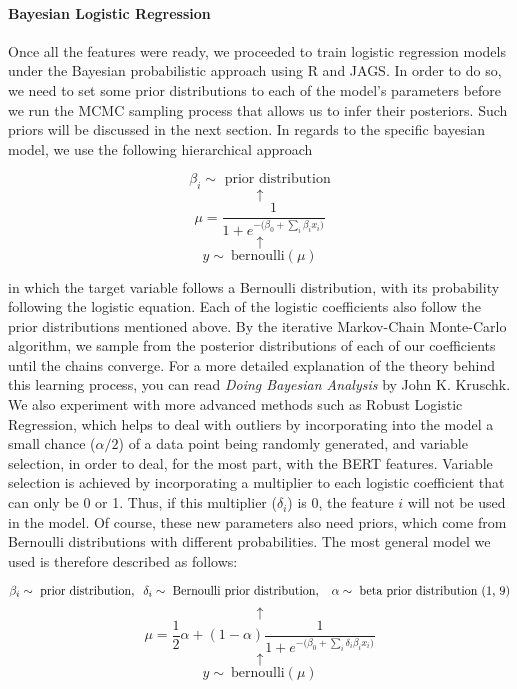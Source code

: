 \documentclass[man, floatsintext, 10pt]{apa6}
\begin{document}
\vspace{2mm}

\paragraph{Bayesian Logistic Regression} Once all the features were ready, we proceeded to train logistic regression models under the Bayesian probabilistic approach using R and JAGS. In order to do so, we need to set some prior distributions to each of the model's parameters before we run the MCMC sampling process that allows us to infer their posteriors. Such priors will be discussed in the next section. In regards to the specific bayesian model, we use the following hierarchical approach 

\[\beta_i \sim \text{ prior distribution} \] \[ \uparrow \] \[ \mu = \frac{1}{1 + e^{-\big(\beta_0 + \sum_i \beta_i x_i \big)}} \] \vspace{0.01mm}  \[ \uparrow \] \[ y \sim\ \text{bernoulli} (\mu) \]

in which the target variable follows a Bernoulli distribution, with its probability following the logistic equation. Each of the logistic coefficients also follow the prior distributions mentioned above. By the iterative Markov-Chain Monte-Carlo algorithm, we sample from the posterior distributions of each of our coefficients until the chains converge. For a more detailed explanation of the theory behind this learning process, you can read \textit{Doing Bayesian Analysis} by John K. Kruschk. We also experiment with more advanced methods such as Robust Logistic Regression, which helps to deal with outliers by incorporating into the model a small chance ($\alpha/2$) of a data point being randomly generated, and variable selection, in order to deal, for the most part, with the BERT features. Variable selection is achieved by incorporating a multiplier to each logistic coefficient that can only be 0 or 1. Thus, if this multiplier ($\delta_i$) is 0, the feature $i$ will not be used in the model. Of course, these new parameters also need priors, which come from Bernoulli distributions with different probabilities. The most general model we used is therefore described as follows:

 \[\beta_i \sim \text{ prior distribution}, \hspace{2mm} \delta_i \sim \text{ Bernoulli prior distribution}, \hspace{2mm}\  \alpha \sim \text{ beta prior distribution (1, 9)} \] \[ \uparrow \] \[ \mu = \frac{1}{2} \alpha + (1 - \alpha) \frac{1}{1 + e^{-\big(\beta_0 + \sum_i \delta_i \beta_i x_i \big)}} \] \vspace{0.01mm}  \[ \uparrow \] \[ y \sim\ \text{bernoulli} (\mu) \]
 
\end{document}
